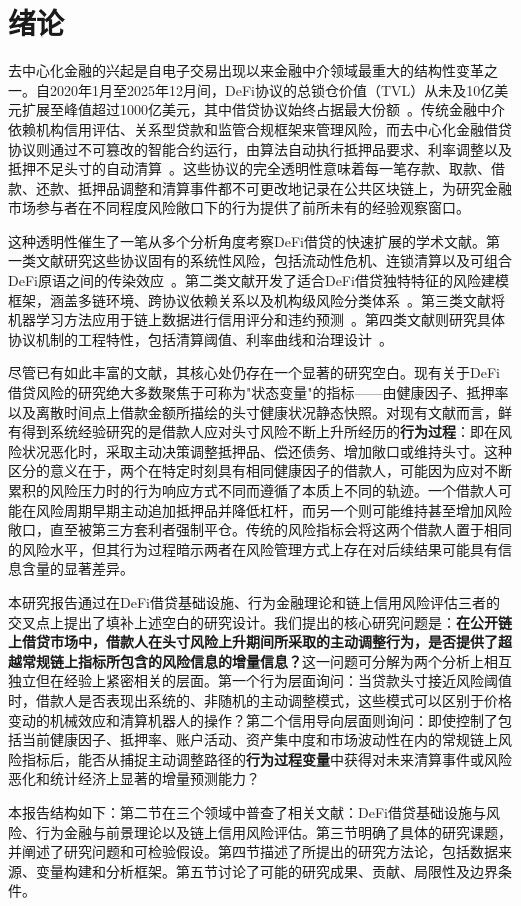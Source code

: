 \section{绪论}

去中心化金融的兴起是自电子交易出现以来金融中介领域最重大的结构性变革之一。自2020年1月至2025年12月间，DeFi协议的总锁仓价值（TVL）从未及10亿美元扩展至峰值超过1000亿美元，其中借贷协议始终占据最大份额~\cite{schar2021decentralized2, jiang2023defi}。传统金融中介依赖机构信用评估、关系型贷款和监管合规框架来管理风险，而去中心化金融借贷协议则通过不可篡改的智能合约运行，由算法自动执行抵押品要求、利率调整以及抵押不足头寸的自动清算~\cite{gudgeon2020defi}。这些协议的完全透明性意味着每一笔存款、取款、借款、还款、抵押品调整和清算事件都不可更改地记录在公共区块链上，为研究金融市场参与者在不同程度风险敞口下的行为提供了前所未有的经验观察窗口。

这种透明性催生了一笔从多个分析角度考察DeFi借贷的快速扩展的学术文献。第一类文献研究这些协议固有的系统性风险，包括流动性危机、连锁清算以及可组合DeFi原语之间的传染效应~\cite{qin2021empirical, perez2020liquidations}。第二类文献开发了适合DeFi借贷独特特征的风险建模框架，涵盖多链环境、跨协议依赖关系以及机构级风险分类体系~\cite{oberholzer2026toward, sevim2026interoperability}。第三类文献将机器学习方法应用于链上数据进行信用评分和违约预测~\cite{ghosh2024onchain}。第四类文献则研究具体协议机制的工程特性，包括清算阈值、利率曲线和治理设计~\cite{iftikhar2025automated, tovanich2023contagion}。

尽管已有如此丰富的文献，其核心处仍存在一个显著的研究空白。现有关于DeFi借贷风险的研究绝大多数聚焦于可称为"状态变量"的指标——由健康因子、抵押率以及离散时间点上借款金额所描绘的头寸健康状况静态快照。对现有文献而言，鲜有得到系统经验研究的是借款人应对头寸风险不断上升所经历的\textbf{行为过程}：即在风险状况恶化时，采取主动决策调整抵押品、偿还债务、增加敞口或维持头寸。这种区分的意义在于，两个在特定时刻具有相同健康因子的借款人，可能因为应对不断累积的风险压力时的行为响应方式不同而遵循了本质上不同的轨迹。一个借款人可能在风险周期早期主动追加抵押品并降低杠杆，而另一个则可能维持甚至增加风险敞口，直至被第三方套利者强制平仓。传统的风险指标会将这两个借款人置于相同的风险水平，但其行为过程暗示两者在风险管理方式上存在对后续结果可能具有信息含量的显著差异。

本研究报告通过在DeFi借贷基础设施、行为金融理论和链上信用风险评估三者的交叉点上提出了填补上述空白的研究设计。我们提出的核心研究问题是：\textbf{在公开链上借贷市场中，借款人在头寸风险上升期间所采取的主动调整行为，是否提供了超越常规链上指标所包含的风险信息的增量信息？}这一问题可分解为两个分析上相互独立但在经验上紧密相关的层面。第一个行为层面询问：当贷款头寸接近风险阈值时，借款人是否表现出系统的、非随机的主动调整模式，这些模式可以区别于价格变动的机械效应和清算机器人的操作？第二个信用导向层面则询问：即使控制了包括当前健康因子、抵押率、账户活动、资产集中度和市场波动性在内的常规链上风险指标后，能否从捕捉主动调整路径的\textbf{行为过程变量}中获得对未来清算事件或风险恶化和统计经济上显著的增量预测能力？

本报告结构如下：第二节在三个领域中普查了相关文献：DeFi借贷基础设施与风险、行为金融与前景理论以及链上信用风险评估。第三节明确了具体的研究课题，并阐述了研究问题和可检验假设。第四节描述了所提出的研究方法论，包括数据来源、变量构建和分析框架。第五节讨论了可能的研究成果、贡献、局限性及边界条件。


\vspace{4pt}
